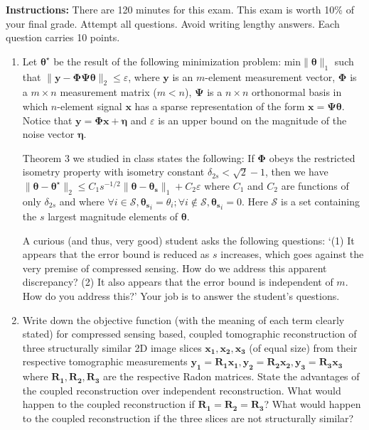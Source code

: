 \documentclass[12pt]{article}
\begin{document}
\vspace{-1in}
\maketitle
\vspace{-0.3in}
\textbf{Instructions:} There are 120 minutes for this exam. This exam is worth 10\% of your final grade. Attempt all questions. Avoid writing lengthy answers. Each question carries 10 points. 

\begin{enumerate}
\item Let $\boldsymbol{\theta^{\star}}$ be the result of the following minimization problem: $\textrm{min} \|\boldsymbol{\theta}\|_1$ such that $\|\boldsymbol{y}-\boldsymbol{\Phi \Psi \theta}\|_2 \leq \varepsilon$, where $\boldsymbol{y}$ is an $m$-element measurement vector, $\boldsymbol{\Phi}$ is a $m \times n$ measurement matrix ($m < n$), $\boldsymbol{\Psi}$ is a $n \times n$ orthonormal basis in which $n$-element signal $\boldsymbol{x}$ has a sparse representation of the form $\boldsymbol{x} = \boldsymbol{\Psi \theta}$. Notice that $\boldsymbol{y} = \boldsymbol{\Phi x} + \boldsymbol{\eta}$ and $\varepsilon$ is an upper bound on the magnitude of the noise vector $\boldsymbol{\eta}$.

Theorem 3 we studied in class states the following: If $\boldsymbol{\Phi}$ obeys the restricted isometry property with isometry constant $\delta_{2s} < \sqrt{2}-1$, then we have $\|\boldsymbol{\theta} - \boldsymbol{\theta^{\star}}\|_2 \leq C_1 s^{-1/2}\|\boldsymbol{\theta}-\boldsymbol{\theta_s}\|_1 + C_2 \varepsilon$ where $C_1$ and $C_2$ are functions of only $\delta_{2s}$ and where $\forall i \in \mathcal{S}, \boldsymbol{\theta_s}_i = \theta_i; \forall i \notin \mathcal{S}, \boldsymbol{\theta_s}_i = 0$. Here $\mathcal{S}$ is a set containing the $s$ largest magnitude elements of $\boldsymbol{\theta}$. 

A curious (and thus, very good) student asks the following questions: `(1) It appears that the error bound is reduced as $s$ increases, which goes against the very premise of compressed sensing. How do we address this apparent discrepancy? (2) It also appears that the error bound is independent of $m$. How do you address this?' Your job is to answer the student's questions.

\item Write down the objective function (with the meaning of each term clearly stated) for compressed sensing based, coupled tomographic reconstruction of three structurally similar 2D image slices $\boldsymbol{x_1}, \boldsymbol{x_2}, \boldsymbol{x_3}$ (of equal size) from their respective tomographic measurements $\boldsymbol{y_1} = \boldsymbol{R_1 x_1}, \boldsymbol{y_2} = \boldsymbol{R_2 x_2}, \boldsymbol{y_3} = \boldsymbol{R_3 x_3}$ where $\boldsymbol{R_1}, \boldsymbol{R_2}, \boldsymbol{R_3}$ are the respective Radon matrices. State the advantages of the coupled reconstruction over independent reconstruction. What would happen to the coupled reconstruction if $\boldsymbol{R_1} = \boldsymbol{R_2} = \boldsymbol{R_3}$? What would happen to the coupled reconstruction if the three slices are not structurally similar?


\end{enumerate}
\end{document}
